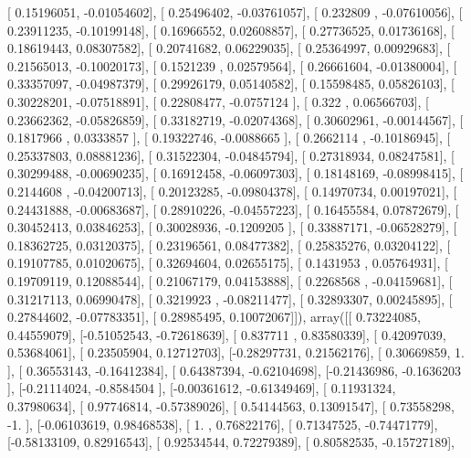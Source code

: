 \documentclass{article}
\begin{document}
       [ 0.15196051, -0.01054602],
       [ 0.25496402, -0.03761057],
       [ 0.232809  , -0.07610056],
       [ 0.23911235, -0.10199148],
       [ 0.16966552,  0.02608857],
       [ 0.27736525,  0.01736168],
       [ 0.18619443,  0.08307582],
       [ 0.20741682,  0.06229035],
       [ 0.25364997,  0.00929683],
       [ 0.21565013, -0.10020173],
       [ 0.1521239 ,  0.02579564],
       [ 0.26661604, -0.01380004],
       [ 0.33357097, -0.04987379],
       [ 0.29926179,  0.05140582],
       [ 0.15598485,  0.05826103],
       [ 0.30228201, -0.07518891],
       [ 0.22808477, -0.0757124 ],
       [ 0.322     ,  0.06566703],
       [ 0.23662362, -0.05826859],
       [ 0.33182719, -0.02074368],
       [ 0.30602961, -0.00144567],
       [ 0.1817966 ,  0.0333857 ],
       [ 0.19322746, -0.0088665 ],
       [ 0.2662114 , -0.10186945],
       [ 0.25337803,  0.08881236],
       [ 0.31522304, -0.04845794],
       [ 0.27318934,  0.08247581],
       [ 0.30299488, -0.00690235],
       [ 0.16912458, -0.06097303],
       [ 0.18148169, -0.08998415],
       [ 0.2144608 , -0.04200713],
       [ 0.20123285, -0.09804378],
       [ 0.14970734,  0.00197021],
       [ 0.24431888, -0.00683687],
       [ 0.28910226, -0.04557223],
       [ 0.16455584,  0.07872679],
       [ 0.30452413,  0.03846253],
       [ 0.30028936, -0.1209205 ],
       [ 0.33887171, -0.06528279],
       [ 0.18362725,  0.03120375],
       [ 0.23196561,  0.08477382],
       [ 0.25835276,  0.03204122],
       [ 0.19107785,  0.01020675],
       [ 0.32694604,  0.02655175],
       [ 0.1431953 ,  0.05764931],
       [ 0.19709119,  0.12088544],
       [ 0.21067179,  0.04153888],
       [ 0.2268568 , -0.04159681],
       [ 0.31217113,  0.06990478],
       [ 0.3219923 , -0.08211477],
       [ 0.32893307,  0.00245895],
       [ 0.27844602, -0.07783351],
       [ 0.28985495,  0.10072067]]), array([[ 0.73224085,  0.44559079],
       [-0.51052543, -0.72618639],
       [ 0.837711  ,  0.83580339],
       [ 0.42097039,  0.53684061],
       [ 0.23505904,  0.12712703],
       [-0.28297731,  0.21562176],
       [ 0.30669859,  1.        ],
       [ 0.36553143, -0.16412384],
       [ 0.64387394, -0.62104698],
       [-0.21436986, -0.1636203 ],
       [-0.21114024, -0.8584504 ],
       [-0.00361612, -0.61349469],
       [ 0.11931324,  0.37980634],
       [ 0.97746814, -0.57389026],
       [ 0.54144563,  0.13091547],
       [ 0.73558298, -1.        ],
       [-0.06103619,  0.98468538],
       [ 1.        ,  0.76822176],
       [ 0.71347525, -0.74471779],
       [-0.58133109,  0.82916543],
       [ 0.92534544,  0.72279389],
       [ 0.80582535, -0.15727189],
\end{document}
